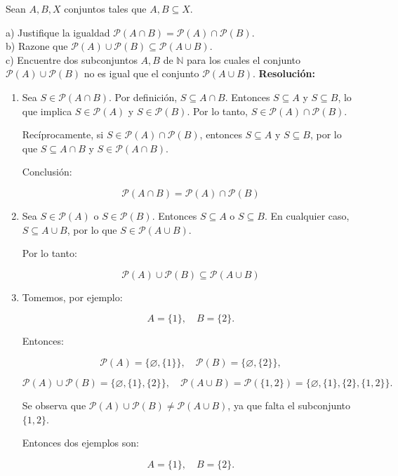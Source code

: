\documentclass[a4paper,12pt]{article}
\begin{document}
\begin{ejercicio}[title=Ejercicio 5]
Sean $A,B,X$ conjuntos tales que $A,B\subseteq X$.

a) Justifique la igualdad $\mathcal{P}(A\cap B) = \mathcal{P}(A)\cap \mathcal{P}(B)$.\\
b) Razone que $\mathcal{P}(A)\cup \mathcal{P}(B)\subseteq \mathcal{P}(A\cup B)$.\\
c) Encuentre dos subconjuntos $A,B$ de $\mathbb{N}$ para los cuales el conjunto
$\mathcal{P}(A)\cup \mathcal{P}(B)$ no es igual que el conjunto $\mathcal{P}(A\cup B)$.
\tcblower
\textbf{Resolución:}

\begin{enumerate}
\item[\textbf{a)}] 
Sea $S \in \mathcal{P}(A\cap B)$. Por definición, $S \subseteq A\cap B$.  
Entonces $S \subseteq A$ y $S \subseteq B$, lo que implica $S \in \mathcal{P}(A)$ y $S \in \mathcal{P}(B)$.  
Por lo tanto, $S \in \mathcal{P}(A)\cap \mathcal{P}(B)$.  

Recíprocamente, si $S \in \mathcal{P}(A)\cap \mathcal{P}(B)$, entonces $S \subseteq A$ y $S \subseteq B$, por lo que $S \subseteq A\cap B$ y $S \in \mathcal{P}(A\cap B)$.  

Conclusión:

\[
\boxed{\mathcal{P}(A\cap B) = \mathcal{P}(A)\cap \mathcal{P}(B)}
\]

\item[\textbf{b)}] 
Sea $S \in \mathcal{P}(A)$ o $S \in \mathcal{P}(B)$. Entonces $S \subseteq A$ o $S \subseteq B$.  
En cualquier caso, $S \subseteq A \cup B$, por lo que $S \in \mathcal{P}(A\cup B)$.  

Por lo tanto:

\[
\boxed{\mathcal{P}(A)\cup \mathcal{P}(B) \subseteq \mathcal{P}(A\cup B)}
\]

\item[\textbf{c)}] 
Tomemos, por ejemplo:

\[
A = \{1\}, \quad B = \{2\}.
\]

Entonces:

\[
\mathcal{P}(A) = \{\varnothing, \{1\}\}, \quad \mathcal{P}(B) = \{\varnothing, \{2\}\},
\]

\[
\mathcal{P}(A)\cup \mathcal{P}(B) = \{\varnothing, \{1\}, \{2\}\}, \quad \mathcal{P}(A\cup B) = \mathcal{P}(\{1,2\}) = \{\varnothing, \{1\}, \{2\}, \{1,2\}\}.
\]

Se observa que $\mathcal{P}(A)\cup \mathcal{P}(B) \neq \mathcal{P}(A\cup B)$, ya que falta el subconjunto $\{1,2\}$.

Entonces dos ejemplos son:

\[
\boxed{A = \{1\}, \quad B = \{2\}.}
\]

\end{enumerate}

\end{ejercicio}
\end{document}
